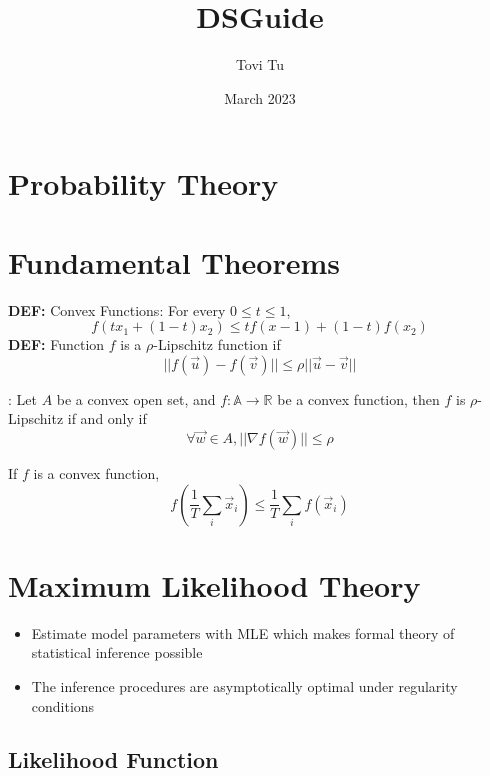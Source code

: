 \documentclass[9pt]{article}
\title{DSGuide}
\author{Tovi Tu}
\date{March 2023}
\newcommand{\de}{\textbf{DEF: }}
\newcommand{\x}{\vec{x}}
\newenvironment{theorem}[2][Theorem]{\begin{trivlist}
\item[\hskip \labelsep {\bfseries #1}\hskip \labelsep {\bfseries #2}]}{\end{trivlist}}
\begin{document}
\maketitle

\section{Probability Theory}


\newpage
\section{Fundamental Theorems}

\de Convex Functions: For every $0\le t\le1$,
$$
f(tx_1+(1-t)x_2)\le tf(x-1)+(1-t)f(x_2)
$$
\de Function $f$ is a $\rho$-Lipschitz function if 
$$
||f(\vec u)-f(\vec v)||\le\rho||\vec u - \vec v||
$$
\begin{theorem}{}:
Let $A$ be a convex open set, and $f: \mathbb{A}\to\mathbb{R}$ be a convex function, then $f$ is $\rho$-Lipschitz if and only if 
$$
\forall\vec w \in A,||\nabla f(\vec w)||\le \rho
$$
\end{theorem}
\begin{theorem}{Jensen's Inequality}
If $f$ is a convex function, 
$$
f(\frac{1}{T}\sum_{i}\vec x_i) \le \frac{1}{T}\sum_if(\x_i)
$$
\end{theorem}
\begin{theorem}
{Generalized Inverse}
\end{theorem}
\begin{theorem}
{Singular Value Decomposition}
\end{theorem}
\begin{theorem}{Generalized Inverse}
\end{theorem}

\newpage
\section{Maximum Likelihood Theory}
\begin{itemize}
    \item Estimate model parameters with MLE which makes formal theory of statistical inference possible
    \item The inference procedures are asymptotically optimal under regularity conditions
\end{itemize}

\subsection{Likelihood Function}
\end{document}
